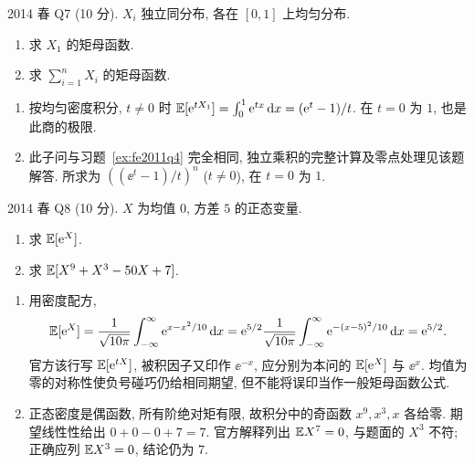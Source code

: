 \begin{exercise}\label{ex:fe2014q7}
2014 春 Q7 (10 分). $X_i$ 独立同分布, 各在 $[0,1]$ 上均匀分布.
\begin{enumerate}[label=(\alph*)]
\item\label{ex:fe2014q7-a} 求 $X_1$ 的矩母函数.
\item\label{ex:fe2014q7-b} 求 $\sum_{i=1}^nX_i$ 的矩母函数.
\end{enumerate}
\end{exercise}
\begin{solution}
\begin{enumerate}[label=(\alph*)]
\item\label{sol:fe2014q7-a} 按均匀密度积分, $t\ne0$ 时 $\mathbb E[\mathrm e^{tX_1}]=\int_0^1\mathrm e^{tx}\,\mathrm d x=(\mathrm e^t-1)/t$. 在 $t=0$ 为 $1$, 也是此商的极限.
\item\label{sol:fe2014q7-b} 此子问与习题~\ref{ex:fe2011q4} 完全相同, 独立乘积的完整计算及零点处理见该题解答. 所求为 $((\ee^t-1)/t)^n$ ($t\ne0$), 在 $t=0$ 为 $1$.
\end{enumerate}
\end{solution}

\begin{exercise}\label{ex:fe2014q8}
2014 春 Q8 (10 分). $X$ 为均值 $0$, 方差 $5$ 的正态变量.
\begin{enumerate}[label=(\alph*)]
\item\label{ex:fe2014q8-a} 求 $\mathbb E[\mathrm e^X]$.
\item\label{ex:fe2014q8-b} 求 $\mathbb E[X^9+X^3-50X+7]$.
\end{enumerate}
\end{exercise}
\begin{solution}
\begin{enumerate}[label=(\alph*)]
\item\label{sol:fe2014q8-a} 用密度配方,
\[
 \mathbb E[\mathrm e^X]=\frac1{\sqrt{10\pi}}\int_{-\infty}^\infty\mathrm e^{x-x^2/10}\,\mathrm d x
 =\mathrm e^{5/2}\frac1{\sqrt{10\pi}}\int_{-\infty}^\infty\mathrm e^{-(x-5)^2/10}\,\mathrm d x=\mathrm e^{5/2}.
\]
官方该行写 $\mathbb E[\mathrm e^{tX}]$, 被积因子又印作 $\ee^{-x}$, 应分别为本问的 $\mathbb E[\mathrm e^X]$ 与 $\ee^x$. 均值为零的对称性使负号碰巧仍给相同期望, 但不能将误印当作一般矩母函数公式.
\item\label{sol:fe2014q8-b} 正态密度是偶函数, 所有阶绝对矩有限, 故积分中的奇函数 $x^9,x^3,x$ 各给零. 期望线性性给出 $0+0-0+7=7$. 官方解释列出 $\mathbb E X^7=0$, 与题面的 $X^3$ 不符; 正确应列 $\mathbb E X^3=0$, 结论仍为 $7$.
\end{enumerate}
\end{solution}

